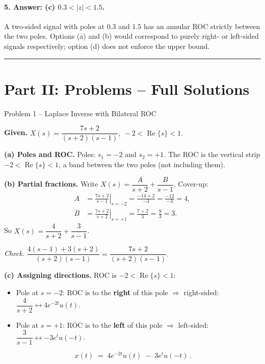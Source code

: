 \documentclass[11pt]{article}
\begin{document}
\paragraph{5. Answer: (c) $0.3 < |z| < 1.5$.}
A two-sided signal with poles at $0.3$ and $1.5$ has an annular ROC strictly between the two poles. Options (a) and (b) would correspond to purely right- or left-sided signals respectively; option (d) does not enforce the upper bound.

\vspace{8pt}
\hrule
\vspace{10pt}

\section*{Part II: Problems -- Full Solutions}

\begin{problembox}{Problem 1 -- Laplace Inverse with Bilateral ROC}
\end{problembox}

\textbf{Given.} $X(s) = \dfrac{7s+2}{(s+2)(s-1)},\ -2 < \operatorname{Re}\{s\} < 1.$

\textbf{(a) Poles and ROC.}
Poles: $s_1=-2$ and $s_2=+1$. The ROC is the vertical strip $-2 < \operatorname{Re}\{s\} < 1$, a band between the two poles (not including them).

\textbf{(b) Partial fractions.} Write $X(s) = \dfrac{A}{s+2} + \dfrac{B}{s-1}$. Cover-up:
\begin{align*}
A &= \left.\frac{7s+2}{s-1}\right|_{s=-2} = \frac{-14+2}{-3} = \frac{-12}{-3} = 4,\\
B &= \left.\frac{7s+2}{s+2}\right|_{s=+1} = \frac{7+2}{3} = \frac{9}{3} = 3.
\end{align*}
So $X(s) = \dfrac{4}{s+2} + \dfrac{3}{s-1}$.

\textit{Check.} $\dfrac{4(s-1)+3(s+2)}{(s+2)(s-1)} = \dfrac{7s+2}{(s+2)(s-1)}.$ \checkmark

\textbf{(c) Assigning directions.} ROC is $-2<\operatorname{Re}\{s\}<1$:
\begin{itemize}[leftmargin=*, itemsep=0pt]
    \item Pole at $s=-2$: ROC is to the \textbf{right} of this pole $\Rightarrow$ right-sided:\quad $\dfrac{4}{s+2}\leftrightarrow 4e^{-2t}u(t)$.
    \item Pole at $s=+1$: ROC is to the \textbf{left} of this pole $\Rightarrow$ left-sided:\quad $\dfrac{3}{s-1}\leftrightarrow -3e^{t}u(-t)$.
\end{itemize}
\[
\boxed{\,x(t) \;=\; 4e^{-2t}u(t)\;-\;3e^{t}u(-t)\,.}
\]
\end{document}
